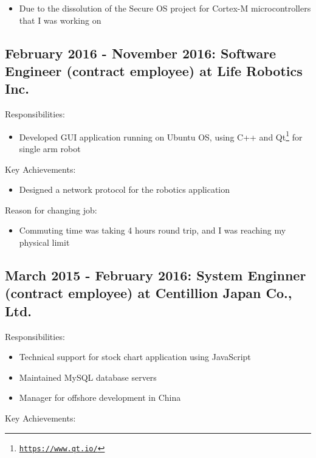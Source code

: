 \documentclass[letterpaper]{article}
\begin{document}
\begin{itemize}
  \item Due to the dissolution of the Secure OS project for Cortex-M microcontrollers that I was working on
\end{itemize}

\subsection*{February 2016 - November 2016: Software Engineer (contract employee) at Life Robotics Inc.}

\noindent Responsibilities:

\begin{itemize}
  \item Developed GUI application running on Ubuntu OS, using C++ and Qt\footnote{\href{https://www.qt.io/}{\tt https://www.qt.io/}} for single arm robot
\end{itemize}

\noindent Key Achievements:

\begin{itemize}
  \item Designed a network protocol for the robotics application
\end{itemize}

\noindent Reason for changing job:

\begin{itemize}
  \item Commuting time was taking 4 hours round trip, and I was reaching my physical limit
\end{itemize}

\subsection*{March 2015 - February 2016: System Enginner (contract employee) at Centillion Japan Co., Ltd.}

\noindent Responsibilities:

\begin{itemize}
  \item Technical support for stock chart application using JavaScript
  \item Maintained MySQL database servers
  \item Manager for offshore development in China
\end{itemize}

\noindent Key Achievements:
\end{document}

